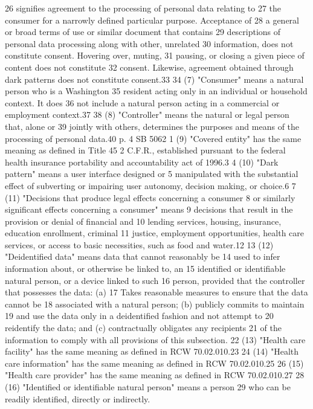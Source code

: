 26 signifies agreement to the processing of personal data relating to
27 the consumer for a narrowly defined particular purpose. Acceptance of
28 a general or broad terms of use or similar document that contains
29 descriptions of personal data processing along with other, unrelated
30 information, does not constitute consent. Hovering over, muting,
31 pausing, or closing a given piece of content does not constitute
32 consent. Likewise, agreement obtained through dark patterns does not
constitute consent.33
34 (7) "Consumer" means a natural person who is a Washington
35 resident acting only in an individual or household context. It does
36 not include a natural person acting in a commercial or employment
context.37
38 (8) "Controller" means the natural or legal person that, alone or
39 jointly with others, determines the purposes and means of the
processing of personal data.40
p. 4 SB 5062
1 (9) "Covered entity" has the same meaning as defined in Title 45
2 C.F.R., established pursuant to the federal health insurance
portability and accountability act of 1996.3
4 (10) "Dark pattern" means a user interface designed or
5 manipulated with the substantial effect of subverting or impairing
user autonomy, decision making, or choice.6
7 (11) "Decisions that produce legal effects concerning a consumer
8 or similarly significant effects concerning a consumer" means
9 decisions that result in the provision or denial of financial and
10 lending services, housing, insurance, education enrollment, criminal
11 justice, employment opportunities, health care services, or access to
basic necessities, such as food and water.12
13 (12) "Deidentified data" means data that cannot reasonably be
14 used to infer information about, or otherwise be linked to, an
15 identified or identifiable natural person, or a device linked to such
16 person, provided that the controller that possesses the data: (a)
17 Takes reasonable measures to ensure that the data cannot be
18 associated with a natural person; (b) publicly commits to maintain
19 and use the data only in a deidentified fashion and not attempt to
20 reidentify the data; and (c) contractually obligates any recipients
21 of the information to comply with all provisions of this subsection.
22 (13) "Health care facility" has the same meaning as defined in
RCW 70.02.010.23
24 (14) "Health care information" has the same meaning as defined in
RCW 70.02.010.25
26 (15) "Health care provider" has the same meaning as defined in
RCW 70.02.010.27
28 (16) "Identified or identifiable natural person" means a person
29 who can be readily identified, directly or indirectly.
